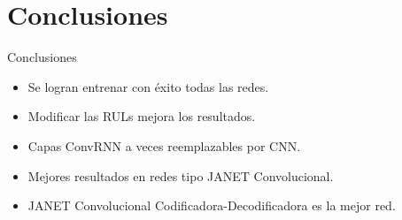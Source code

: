 \section{Conclusiones}

\begin{frame}{Conclusiones}
\begin{itemize}
\pause
    \item Se logran entrenar con éxito todas las redes.
    \pause
    \item Modificar las RULs mejora los resultados.
    \pause
    \item Capas ConvRNN a veces reemplazables por CNN.
    \pause
    \item Mejores resultados en redes tipo JANET Convolucional.
    \pause
    \item JANET Convolucional Codificadora-Decodificadora es la mejor red. 
\end{itemize}
\end{frame}
